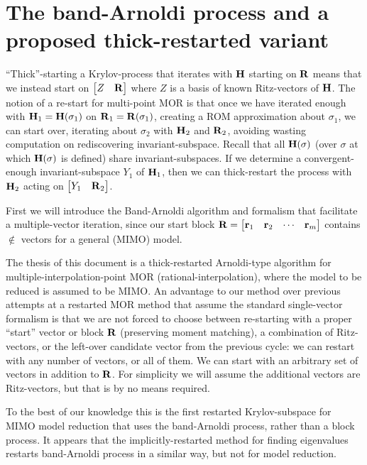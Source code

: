 \chapter{The band-Arnoldi process and a proposed thick-restarted variant}
\label{ch:newstuff2}
``Thick''-starting a Krylov-process that iterates with $\textbf{\textup{H}}$ starting on $\textbf{\textup{R}}$ means that we  instead start on $\begin{bmatrix} Z & \textbf{\textup{R}}\end{bmatrix}$ where $Z$ is a basis of known Ritz-vectors of $\textbf{\textup{H}}$.  The notion of a re-start for multi-point MOR is that once we have iterated enough with $\textbf{\textup{H}}_1= \textbf{\textup{H}}(\sigma_1)$ on $\textbf{\textup{R}}_1=\textbf{\textup{R}}(\sigma_1)$, creating a ROM approximation about $\sigma_1$, we can start over, iterating about $\sigma_2$ with $\textbf{\textup{H}}_2$ and $\textbf{\textup{R}}_2$, avoiding wasting computation on rediscovering invariant-subspace.   Recall that all $\textbf{\textup{H}}(\sigma)$ (over $\sigma$ at which $\textbf{\textup{H}}(\sigma)$ is defined) share invariant-subspaces.    If we determine a convergent-enough invariant-subspace  $Y_1$ of $\textbf{\textup{H}}_1$, then we can thick-restart the process with $\textbf{\textup{H}}_2$ acting on $\begin{bmatrix} Y_1 & \textbf{\textup{R}}_2\end{bmatrix}$. 

First we will introduce the Band-Arnoldi algorithm and formalism that facilitate a multiple-vector iteration, since 
our start block $\textbf{\textup{R}}= \begin{bmatrix} \textbf{\textup{r}}_1&\textbf{\textup{r}}_2&\cdots&\textbf{\textup{r}}_m\end{bmatrix}$ contains $\nin$ vectors for a general (MIMO) model.    

The thesis of this document is a thick-restarted Arnoldi-type algorithm for multiple-interpolation-point MOR (rational-interpolation), where the model to be reduced is assumed to be MIMO.    An advantage to our method over previous attempts at a restarted MOR method that assume the standard single-vector formalism is that we are not forced to choose between re-starting with a proper ``start'' vector or block $\textbf{\textup{R}}$ (preserving moment matching), a combination of Ritz-vectors, or the left-over candidate vector from the previous cycle:  we can restart with any number of vectors, or all of them.    We can start with an arbitrary set of vectors in addition to $\textbf{\textup{R}}$.    For simplicity we will assume the additional vectors are Ritz-vectors, but that is by no means required.    

To the best of our knowledge this is the first restarted Krylov-subspace for MIMO model reduction that uses the band-Arnoldi process, rather than a block process.  It appears that the implicitly-restarted method \cite{band_IRA} for finding eigenvalues restarts band-Arnoldi process in a similar way, but not for model reduction.

